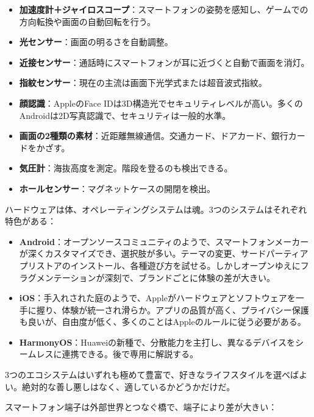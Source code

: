 \begin{itemize}
  \item \textbf{加速度計＋ジャイロスコープ}：スマートフォンの姿勢を感知し、ゲームでの方向転換や画面の自動回転を行う。
  \item \textbf{光センサー}：画面の明るさを自動調整。
  \item \textbf{近接センサー}：通話時にスマートフォンが耳に近づくと自動で画面を消灯。
  \item \textbf{指紋センサー}：現在の主流は画面下光学式または超音波式指紋。
  \item \textbf{顔認識}：AppleのFace IDは3D構造光でセキュリティレベルが高い。多くのAndroidは2D写真認識で、セキュリティは一般的水準。
  \item \textbf{画面の2種類の素材}：近距離無線通信。交通カード、ドアカード、銀行カードをかざす。
  \item \textbf{気圧計}：海抜高度を測定。階段を登るのも検出できる。
  \item \textbf{ホールセンサー}：マグネットケースの開閉を検出。
\end{itemize}


ハードウェアは体、オペレーティングシステムは魂。3つのシステムはそれぞれ特色がある：

\begin{itemize}
  \item \textbf{Android}：オープンソースコミュニティのようで、スマートフォンメーカーが深くカスタマイズでき、選択肢が多い。テーマの変更、サードパーティアプリストアのインストール、各種遊び方を試せる。しかしオープンゆえにフラグメンテーションが深刻で、ブランドごとに体験の差が大きい。
  \item \textbf{iOS}：手入れされた庭のようで、Appleがハードウェアとソフトウェアを一手に握り、体験が統一され滑らか。アプリの品質が高く、プライバシー保護も良いが、自由度が低く、多くのことはAppleのルールに従う必要がある。
  \item \textbf{HarmonyOS}：Huaweiの新種で、分散能力を主打し、異なるデバイスをシームレスに連携できる。後で専用に解説する。
\end{itemize}

3つのエコシステムはいずれも極めて豊富で、好きなライフスタイルを選べばよい。絶対的な善し悪しはなく、適しているかどうかだけだ。


スマートフォン端子は外部世界とつなぐ橋で、端子により差が大きい：

